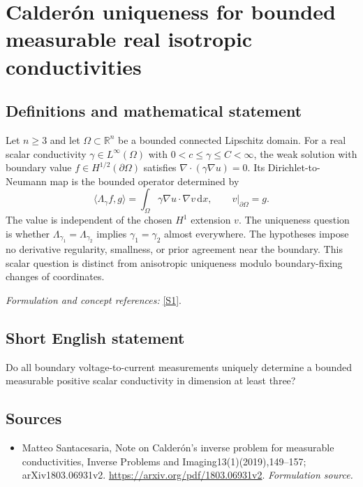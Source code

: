 \documentclass[11pt]{article}
\begin{document}
\section*{\texorpdfstring{Calderón uniqueness for bounded measurable real isotropic conductivities}{Calderón uniqueness for bounded measurable real isotropic conductivities}}\label{statement}
\subsection{Definitions and mathematical statement}
Let $n\ge3$ and let $\Omega\subset{\mathbb{R}}^n$ be a bounded connected Lipschitz domain. For a real scalar conductivity $\gamma\in L^\infty(\Omega)$ with $0<c\le\gamma\le C<\infty$, the weak solution with boundary value $f\in H^{1/2}(\partial\Omega)$ satisfies $\nabla\cdot(\gamma\nabla u)=0$. Its Dirichlet-to-Neumann map is the bounded operator determined by
\[
 \langle\Lambda_\gamma f,g\rangle
 =\int_\Omega\gamma\nabla u\cdot\nabla v{\,\mathrm{d}} x,
 \qquad v|_{\partial\Omega}=g.
\]
The value is independent of the chosen $H^1$ extension $v$. The uniqueness question is whether $\Lambda_{\gamma_1}=\Lambda_{\gamma_2}$ implies $\gamma_1=\gamma_2$ almost everywhere. The hypotheses impose no derivative regularity, smallness, or prior agreement near the boundary. This scalar question is distinct from anisotropic uniqueness modulo boundary-fixing changes of coordinates.
\par\smallskip\textit{Formulation and concept references:} \href{https://arxiv.org/pdf/1803.06931v2}{[S1]}.

\subsection{Short English statement}
Do all boundary voltage-to-current measurements uniquely determine a bounded measurable positive scalar conductivity in dimension at least three?
\subsection{Sources}
\begin{itemize}
\item[S1]Matteo Santacesaria, Note on Calderón's inverse problem for measurable conductivities, Inverse Problems and Imaging13(1)(2019),149–157; arXiv1803.06931v2.
\url{https://arxiv.org/pdf/1803.06931v2}.
\textit{Formulation source.}
\end{itemize}
\end{document}
